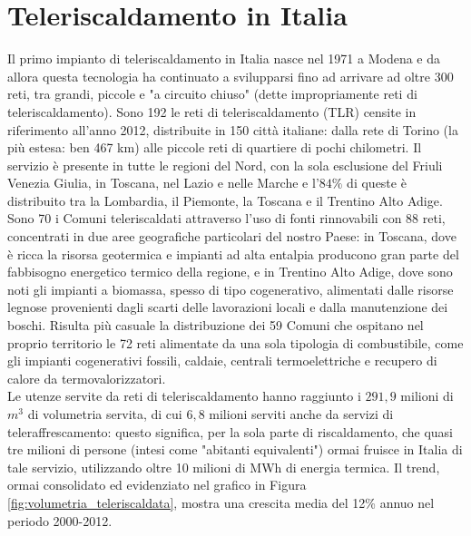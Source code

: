 \documentclass[laurea,oneside,11pt]{USiena_tesiLM}
\begin{document}
\section{Teleriscaldamento in Italia}
Il primo impianto di teleriscaldamento in Italia nasce nel 1971 a Modena e da allora questa tecnologia ha continuato a svilupparsi fino ad arrivare ad oltre 300 reti, tra grandi, piccole e "a circuito chiuso" (dette impropriamente reti di teleriscaldamento). Sono 192 le reti di teleriscaldamento (TLR) censite in riferimento all'anno 2012, distribuite in 150 città italiane: dalla rete di Torino (la più estesa: ben 467 km) alle piccole reti di quartiere di pochi chilometri.
Il servizio è presente in tutte le regioni del Nord, con la sola esclusione del Friuli Venezia Giulia, in Toscana, nel Lazio e nelle Marche e l'$84\%$ di queste è distribuito tra la Lombardia, il Piemonte, la Toscana e il Trentino Alto Adige.\\

Sono 70 i Comuni teleriscaldati attraverso l'uso di fonti rinnovabili con 88 reti, concentrati in due aree geografiche particolari del nostro Paese: in Toscana, dove è ricca la risorsa geotermica e impianti ad alta entalpia producono gran parte del fabbisogno energetico termico della regione, e in Trentino Alto Adige, dove sono noti gli impianti a biomassa, spesso di tipo cogenerativo, alimentati dalle risorse legnose provenienti dagli scarti delle lavorazioni locali e dalla manutenzione dei boschi.
Risulta più casuale  la distribuzione dei 59 Comuni che ospitano nel proprio territorio le 72 reti alimentate da una sola tipologia di combustibile, come gli impianti cogenerativi fossili, caldaie, centrali termoelettriche e recupero di calore da termovalorizzatori. \\

Le utenze servite da reti di teleriscaldamento hanno raggiunto i $291,9$ milioni di $m^3$ di volumetria servita, di cui $6,8$ milioni serviti anche da servizi di teleraffrescamento: questo significa, per la sola parte di riscaldamento, che quasi tre milioni di persone (intesi come "abitanti equivalenti") ormai fruisce in Italia di tale servizio, utilizzando oltre 10 milioni di MWh di energia termica.
Il trend, ormai consolidato ed evidenziato nel grafico in Figura \ref{fig:volumetria_teleriscaldata}, mostra una crescita media del 12\% annuo nel periodo 2000-2012. 
\end{document}
